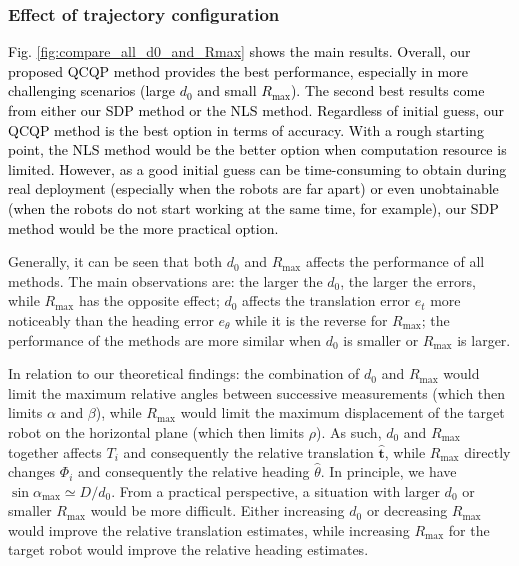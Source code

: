 \documentclass[journal]{IEEEtran}
\begin{document}
\subsubsection{Effect of trajectory configuration} \label{subsubsec:effect_config}

\textcolor{black}{
Fig. \ref{fig:compare_all_d0_and_Rmax} shows the main results. Overall, our proposed QCQP method provides the best performance, especially in more challenging scenarios (large $d_0$ and small $R_{\max}$). The second best results come from either our SDP method or the NLS method. Regardless of initial guess, our QCQP method is the best option in terms of accuracy. With a rough starting point, the NLS method would be the better option when computation resource is limited. However, as a good initial guess can be time-consuming to obtain during real deployment (especially when the robots are far apart) or even unobtainable (when the robots do not start working at the same time, for example), our SDP method would be the more practical option.}

Generally, it can be seen that both $d_0$ and $R_{\max}$ affects the performance of all methods. The main observations are: the larger the $d_0$, the larger the errors, while $R_{\max}$ has the opposite effect; $d_0$ affects the translation error $e_t$ more noticeably than the heading error $e_{\theta}$ while it is the reverse for $R_{\max}$; the performance of the methods are more similar when $d_0$ is smaller or $R_{\max}$ is larger.


In relation to our theoretical findings: the combination of $d_0$ and $R_{\max}$ would limit the maximum relative angles between successive measurements (which then limits $\alpha$ and $\beta$), while $R_{\max}$ would limit the maximum displacement of the target robot on the horizontal plane (which then limits $\rho$). As such, $d_0$ and $R_{\max}$ together affects $T_i$ and consequently the relative translation $\hat{\mathbf{t}}$, while $R_{\max}$ directly changes $\Phi_i$ and consequently the relative heading $\hat{\theta}$. In principle, we have $\sin\alpha_{\max} \simeq D / d_0$. From a practical perspective, a situation with larger $d_0$ or smaller $R_{\max}$ would be more difficult. Either increasing $d_0$ or decreasing $R_{\max}$ would improve the relative translation estimates, while increasing $R_{\max}$ for the target robot would improve the relative heading estimates.%
\end{document}
